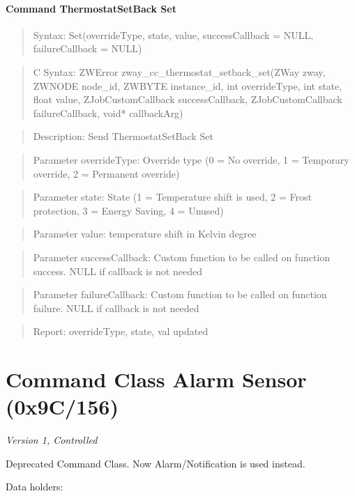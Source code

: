 \paragraph{Command ThermostatSetBack Set}
\begin{quote}Syntax: Set(overrideType, state, value, successCallback = NULL, failureCallback = NULL)\end{quote}
\begin{quote}C Syntax: ZWError zway\_cc\_thermostat\_setback\_set(ZWay zway, ZWNODE node\_id, ZWBYTE instance\_id, int overrideType, int state, float value, ZJobCustomCallback successCallback, ZJobCustomCallback failureCallback, void* callbackArg)\end{quote}
\begin{quote}Description: Send ThermostatSetBack Set\end{quote}
\begin{quote}Parameter overrideType: Override type (0 = No override, 1 = Temporary override, 2 = Permanent override)\end{quote}
\begin{quote}Parameter state: State (1 = Temperature shift is used, 2 = Frost protection, 3 = Energy Saving, 4 = Unused)\end{quote}
\begin{quote}Parameter value: temperature shift in Kelvin degree\end{quote}
\begin{quote}Parameter successCallback: Custom function to be called on function success. NULL if callback is not needed\end{quote}
\begin{quote}Parameter failureCallback: Custom function to be called on function failure. NULL if callback is not needed\end{quote}
\begin{quote}Report: overrideType, state, val updated\end{quote}


\section{Command Class Alarm Sensor (0x9C/156)}

\textit{Version 1, Controlled}
\newline

Deprecated Command Class. Now Alarm/Notification is used instead.
\newline

\noindent
Data holders:

